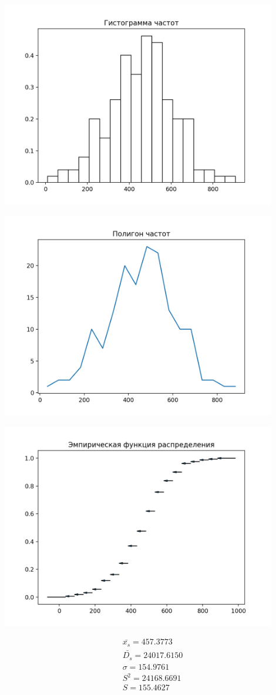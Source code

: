 \includegraphics[width=0.9\textwidth]{src/gr11}

\includegraphics[width=0.9\textwidth]{src/gr12}

\includegraphics[width=0.9\textwidth]{src/gr13}

\begin{gather*}
    \bar{x_{s}} = 457.3773\\
    \bar{D_{s}} = 24017.6150\\
    \sigma = 154.9761\\
    S^2 = 24168.6691\\
    S = 155.4627\\
\end{gather*}